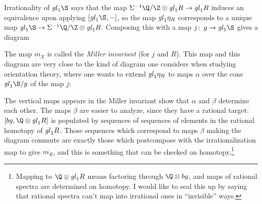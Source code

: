 Irrationality of $\gl_1 \S$ says that the map $\Susp^{-1} \Q/\Z \otimes \gl_1 R \to \gl_1 R$ induces an equivalence upon applying $[\gl_1 \S, -]$, so the map $\mathit{gl}_1 \eta_R$ corresponds to a unique map $\gl_1 \S \to \Susp^{-1} \Q/\Z \otimes \gl_1 R$.  Composing this with a map $j\co g \to \gl_1 \S$ gives a diagram
\begin{center}
\end{center}
The map $m_X$ is called the \textit{Miller invariant} (for $j$ and $R$).  This map and this diagram are very close to the kind of diagram one considers when studying orientation theory, where one wants to extend $\mathit{gl}_1 \eta_R$ to maps $\alpha$ over the cone $\gl_1 \S / g$ of the map $j$:
\begin{center}
\end{center}
The vertical maps appears in the Miller invariant show that $\alpha$ and $\beta$ determine each other.  The maps $\beta$ are easier to analyze, since they have a rational target: $[bg, \Q \otimes \gl_1 R]$ is populated by sequences of sequences of elements in the rational homotopy of $\mathit{gl}_1 R$.  Those sequences which correspond to maps $\beta$ making the diagram commute are exactly those which postcompose with the irrationalization map to give $m_R$, and this is something that can be checked on homotopy.\footnote{Mapping to $\Q \otimes \gl_1 R$ means factoring through $\Q \otimes bg$, and maps of rational spectra are determined on homotopy.  I would like to seal this up by saying that rational spectra can't map into irrational ones in ``invisible'' ways.}



